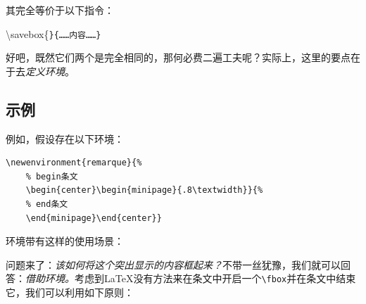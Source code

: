 其完全等价于以下指令：

\begin{dmd}
\backslash savebox\{\verb|}{……内容……}|
\end{dmd}

好吧，既然它们两个是完全相同的，那何必费二遍工夫呢？实际上，这里的要点在于去\emph{定义环境}。

\subsection{示例}

例如，假设存在以下环境：

\begin{dmd}
\begin{verbatim}
\newenvironment{remarque}{%
    % begin条文 
    \begin{center}\begin{minipage}{.8\textwidth}}{% 
    % end条文
    \end{minipage}\end{center}}
\end{verbatim}
\end{dmd}

环境带有这样的使用场景：

\newenvironment{remarque}{%
    \begin{center}\begin{minipage}{.8\textwidth}}{%
    \end{minipage}\end{center}}


问题来了：\emph{该如何将这个突出显示的内容框起来？}不带一丝犹豫，我们就可以回答：\emph{借助环境}\emph{。}考虑到\LaTeX 没有方法来在条文中开启一个\verb|\fbox|并在条文中结束它，我们可以利用如下原则：


